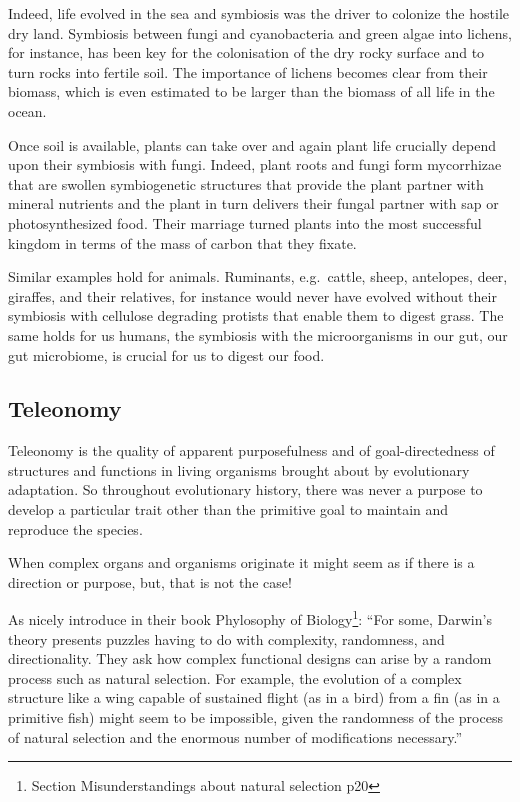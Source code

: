 \documentclass[
  11pt,
]{book}
\begin{document}
Indeed, life evolved in the sea and symbiosis was the driver to colonize the hostile dry land. Symbiosis between fungi and cyanobacteria and green algae into lichens, for instance, has been key for the colonisation of the dry rocky surface and to turn rocks into fertile soil. The importance of lichens becomes clear from their biomass, which is even estimated to be larger than the biomass of all life in the ocean.

Once soil is available, plants can take over and again plant life crucially depend upon their symbiosis with fungi. Indeed, plant roots and fungi form mycorrhizae that are swollen symbiogenetic structures that provide the plant partner with mineral nutrients and the plant in turn delivers their fungal partner with sap or photosynthesized food. Their marriage turned plants into the most successful kingdom in terms of the mass of carbon that they fixate.

Similar examples hold for animals. Ruminants, e.g.~cattle, sheep, antelopes, deer, giraffes, and their relatives, for instance would never have evolved without their symbiosis with cellulose degrading protists that enable them to digest grass. The same holds for us humans, the symbiosis with the microorganisms in our gut, our gut microbiome, is crucial for us to digest our food.

\hypertarget{teleonomy}{%
\subsection{Teleonomy}\label{teleonomy}}

Teleonomy is the quality of apparent purposefulness and of goal-directedness of structures and functions in living organisms brought about by evolutionary adaptation. So throughout evolutionary history, there was never a purpose to develop a particular trait other than the primitive goal to maintain and reproduce the species.

When complex organs and organisms originate it might seem as if there is a direction or purpose, but, that is not the case!

As \citet{rosenberg2008} nicely introduce in their book Phylosophy of Biology\footnote{Section Misunderstandings about natural selection p20}: ``For some, Darwin's theory presents puzzles having to do with complexity, randomness, and directionality. They ask how complex functional designs can arise by a random process such as natural selection. For example, the evolution of a complex structure like a wing capable of sustained flight (as in a bird) from a fin (as in a primitive fish) might seem to be impossible, given the randomness of the process of natural selection and the enormous number of modifications necessary.''
\end{document}
